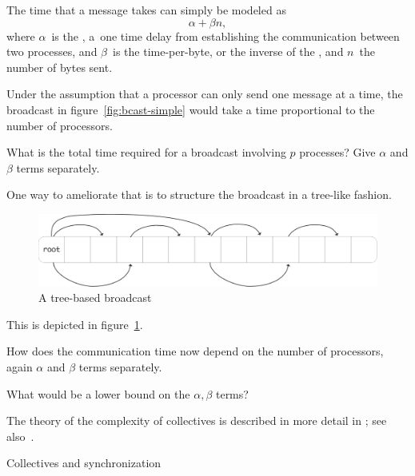 The time that a message takes can simply be modeled as
\[ \alpha +\beta n, \]
where $\alpha$~is the , a~one time
delay from establishing the communication between two processes,
and $\beta$~is the time-per-byte, or the inverse of the ,
and $n$~the number of bytes sent.

Under the assumption that
a processor can only send one message at a time,
the broadcast in
figure~\ref{fig:bcast-simple} would take a time proportional to the
number of processors.

\begin{exercise}
  \label{ex:latencylinear}
  What is the total time required for a broadcast involving $p$
  processes?
  Give $\alpha$ and $\beta$ terms separately.
\end{exercise}

One way to ameliorate that is to structure the
broadcast in a tree-like fashion.
\begin{figure}[ht]
  \includegraphics[scale=.1]{graphics/bcast-tree}
  \caption{A tree-based broadcast}
  \label{fig:bcast-tree}
\end{figure}
This is depicted in figure~\ref{fig:bcast-tree}.

\begin{exercise}
  \label{ex:latencylog}
  How does the
  communication time now depend on the number of processors, again
  $\alpha$ and $\beta$ terms separately.

  What would be a lower bound on the $\alpha,\beta$ terms?
\end{exercise}

The theory
of the complexity of collectives is described in more detail in
; see also~\cite{Chan2007Collective}.

 {Collectives and synchronization}

